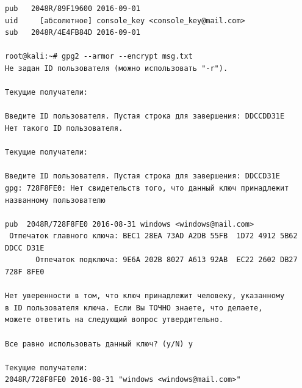 \begin{verbatim}
pub   2048R/89F19600 2016-09-01
uid     [абсолютное] console_key <console_key@mail.com>
sub   2048R/4E4FB84D 2016-09-01

root@kali:~# gpg2 --armor --encrypt msg.txt
Не задан ID пользователя (можно использовать "-r").

Текущие получатели:

Введите ID пользователя. Пустая строка для завершения: DDCCDD31E
Нет такого ID пользователя.

Текущие получатели:

Введите ID пользователя. Пустая строка для завершения: DDCCD31E
gpg: 728F8FE0: Нет свидетельств того, что данный ключ принадлежит названному пользователю

pub  2048R/728F8FE0 2016-08-31 windows <windows@mail.com>
 Отпечаток главного ключа: BEC1 28EA 73AD A2DB 55FB  1D72 4912 5B62 DDCC D31E
       Отпечаток подключа: 9E6A 202B 8027 A613 92AB  EC22 2602 DB27 728F 8FE0

Нет уверенности в том, что ключ принадлежит человеку, указанному
в ID пользователя ключа. Если Вы ТОЧНО знаете, что делаете,
можете ответить на следующий вопрос утвердительно.

Все равно использовать данный ключ? (y/N) y

Текущие получатели:
2048R/728F8FE0 2016-08-31 "windows <windows@mail.com>"

\end{verbatim}
%
